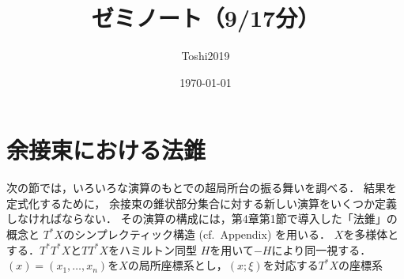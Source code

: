 \documentclass[leqno, 10pt, a4paper, dvipdfmx]{jsarticle}
\title{ゼミノート（9/17分）}
\author{Toshi2019}
\date{\today}
\theoremstyle{definition}
\numberwithin{equation}{section}
\theoremstyle{mystyle}
\newcommand{\cotb}[1][]{T^{\ast}{#1}}
\begin{document}
\maketitle
\section{余接束における法錐}
次の節では，いろいろな演算のもとでの超局所台の振る舞いを調べる．
結果を定式化するために，
余接束の錐状部分集合に対する新しい演算をいくつか定義しなければならない．
その演算の構成には，第4章第1節で導入した「法錐」の概念と
\(\cotb[X]\)のシンプレクティック構造 (cf.~Appendix) を用いる．
\(X\)を多様体とする．\(\cotb[{\cotb[X]}]\)と\(T\cotb[X]\)をハミルトン同型
\(H\)を用いて\(-H\)により同一視する．
\((x)=(x_1,\dots,x_n)\)を\(X\)の局所座標系とし，\((x;\xi)\)を対応する\(\cotb[X]\)の座標系
\end{document}
